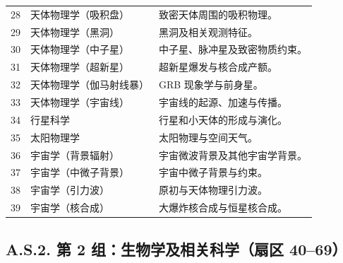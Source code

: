 \documentclass[11pt,a4paper]{article}
\begin{document}
\begin{longtable}{|p{0.9cm}|p{6.0cm}|p{8.6cm}|}
		28 & 天体物理学（吸积盘） & 致密天体周围的吸积物理。 \\
		29 & 天体物理学（黑洞） & 黑洞及相关观测特征。 \\
		30 & 天体物理学（中子星） & 中子星、脉冲星及致密物质约束。 \\
		31 & 天体物理学（超新星） & 超新星爆发与核合成产额。 \\
		32 & 天体物理学（伽马射线暴） & GRB 现象学与前身星。 \\
		33 & 天体物理学（宇宙线） & 宇宙线的起源、加速与传播。 \\
		34 & 行星科学 & 行星和小天体的形成与演化。 \\
		35 & 太阳物理学 & 太阳物理与空间天气。 \\
		36 & 宇宙学（背景辐射） & 宇宙微波背景及其他宇宙学背景。 \\
		37 & 宇宙学（中微子背景） & 宇宙中微子背景与约束。 \\
		38 & 宇宙学（引力波） & 原初与天体物理引力波。 \\
		39 & 宇宙学（核合成） & 大爆炸核合成与恒星核合成。 \\
		\hline
	\end{longtable}
	
	\subsection*{A.S.2. 第 2 组：生物学及相关科学（扇区 40--69）}
	
\end{document}
